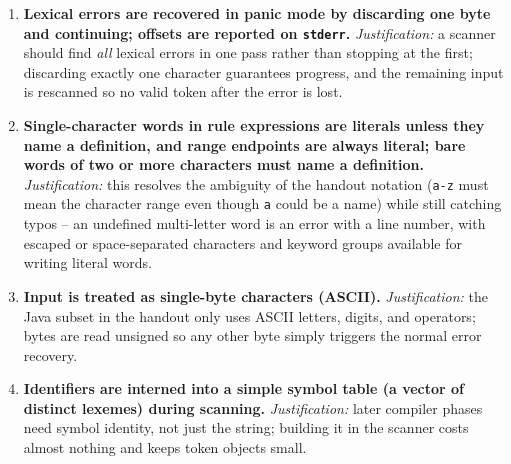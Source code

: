 \documentclass[11pt,a4paper]{article}
\begin{document}
\begin{enumerate}
          example program and the handout's rule-file notation, where
          \texttt{digit+ . digits} denotes concatenation of three units.
    \item \textbf{Lexical errors are recovered in panic mode by discarding one
          byte and continuing; offsets are reported on \texttt{stderr}.}
          \emph{Justification:} a scanner should find \emph{all} lexical errors in
          one pass rather than stopping at the first; discarding exactly one
          character guarantees progress, and the remaining input is rescanned so
          no valid token after the error is lost.
    \item \textbf{Single-character words in rule expressions are literals unless
          they name a definition, and range endpoints are always literal; bare
          words of two or more characters must name a definition.}
          \emph{Justification:} this resolves the ambiguity of the handout
          notation (\texttt{a-z} must mean the character range even though
          \texttt{a} could be a name) while still catching typos --
          an undefined multi-letter word is an error with a line number, with
          escaped or space-separated characters and keyword groups available for
          writing literal words.
    \item \textbf{Input is treated as single-byte characters (ASCII).}
          \emph{Justification:} the Java subset in the handout only uses ASCII
          letters, digits, and operators; bytes are read unsigned so any other
          byte simply triggers the normal error recovery.
    \item \textbf{Identifiers are interned into a simple symbol table (a vector
          of distinct lexemes) during scanning.} \emph{Justification:} later
          compiler phases need symbol identity, not just the string; building it
          in the scanner costs almost nothing and keeps token objects small.
\end{enumerate}
\end{document}
